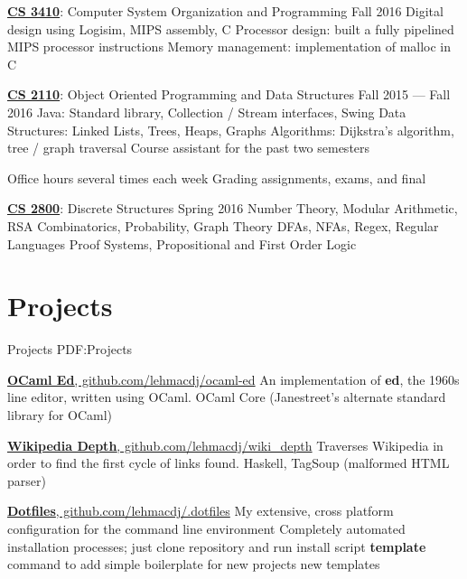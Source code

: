 \documentclass[letterpaper,10pt,oneside]{simpleresumecv}
\begin{document}
\begin{body}
\href{https://www.cs.cornell.edu/courses/cs3410/2016fa/}
{\textbf{CS 3410}}: Computer System Organization and Programming
\hfill Fall 2016
\BulletItem%
Digital design using Logisim, MIPS assembly, C
\BulletItem%
Processor design: built a fully pipelined MIPS processor
instructions
\BulletItem%
Memory management: implementation of malloc in C
\GapNoBreak%

\href{https://www.cs.cornell.edu/courses/cs2110/2015fa/}
{\textbf{CS 2110}}: Object Oriented Programming and Data Structures
\hfill Fall 2015 --- Fall 2016
\BulletItem%
Java: Standard library, Collection / Stream interfaces, Swing
\BulletItem%
Data Structures: Linked Lists, Trees, Heaps, Graphs
\BulletItem%
Algorithms: Dijkstra's algorithm, tree / graph traversal
\BulletItem%
Course assistant for the past two semesters
\begin{detail}
\SubBulletItem%
Office hours several times each week
\SubBulletItem%
Grading assignments, exams, and final
\end{detail}
\GapNoBreak%

\href{https://www.cs.cornell.edu/courses/cs2800/2016sp/}
{\textbf{CS 2800}}: Discrete Structures
\hfill Spring 2016
\BulletItem%
Number Theory, Modular Arithmetic, RSA
\BulletItem%
Combinatorics, Probability, Graph Theory
\BulletItem%
DFAs, NFAs, Regex, Regular Languages
\BulletItem%
Proof Systems, Propositional and First Order Logic
\GapNoBreak%



\section%
{Projects}
{Projects}
{PDF:Projects}

\href{https://www.github.com/lehmacdj/ocaml-ed}
{\textbf{OCaml Ed}, github.com/lehmacdj/ocaml-ed}
\BulletItem%
An implementation of \textbf{ed}, the 1960s line editor, written using OCaml.
\BulletItem%
OCaml Core (Janestreet's alternate standard library for OCaml)
\GapNoBreak%

\href{https://www.github.com/lehmacdj/wiki_depth}
{\textbf{Wikipedia Depth}, github.com/lehmacdj/wiki\_depth}
\BulletItem%
Traverses Wikipedia in order to find the first cycle of links found.
\BulletItem%
Haskell, TagSoup (malformed HTML parser)
\GapNoBreak%

\href{https://www.github.com/lehmacdj/.dotfiles}
{\textbf{Dotfiles}, github.com/lehmacdj/.dotfiles}
\BulletItem%
My extensive, cross platform configuration for the command line environment
\BulletItem%
Completely automated installation processes; just clone repository and run
install script
\BulletItem%
\textbf{template} command to add simple boilerplate for new projects
new templates
\GapNoBreak%


\end{body}
\end{document}
